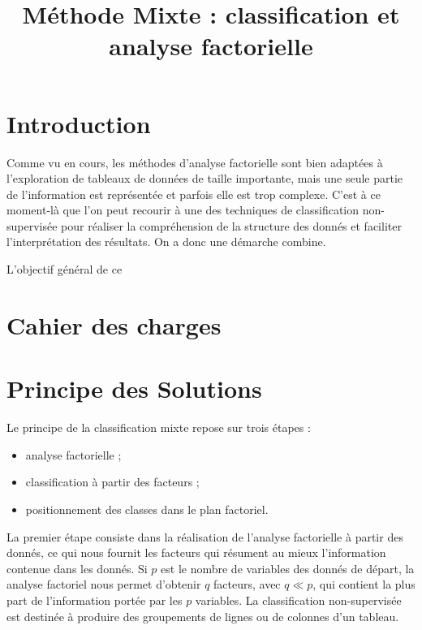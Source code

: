 \documentclass{rapportECL}
\title{Méthode Mixte : classification et analyse factorielle} %
\begin{document}




        
\fairemarges %
\fairepagedegarde %
\tabledematieres %



\section{Introduction} 
Comme vu en cours, les méthodes d’analyse factorielle sont bien adaptées à l’exploration de tableaux de données de taille importante, mais une seule partie de l'information est représentée et parfois elle est trop complexe. C'est à ce moment-là que l'on peut recourir à une des techniques de classification non-supervisée pour réaliser la compréhension de la structure des donnés et faciliter l'interprétation des résultats. On a donc une démarche combine. 

L'objectif général de ce 

\section{Cahier des charges}

\section{Principe des Solutions}
Le principe de la classification mixte repose sur trois étapes :
\begin{itemize}
    \item analyse factorielle ;
    \item classification à partir des facteurs ;
    \item positionnement des classes dans le plan factoriel.
\end{itemize}
La premier étape consiste dans la réalisation de l'analyse factorielle à partir des donnés, ce qui nous fournit les facteurs qui résument au mieux l'information contenue dans les donnés. Si $p$ est le nombre de variables des donnés de départ, la analyse factoriel nous permet d'obtenir $q$ facteurs, avec $q \ll  p$, qui contient la plus part de l'information portée par les $p$ variables.
La classification non-supervisée est destinée à produire des groupements de lignes ou de colonnes d'un tableau.
\end{document}
